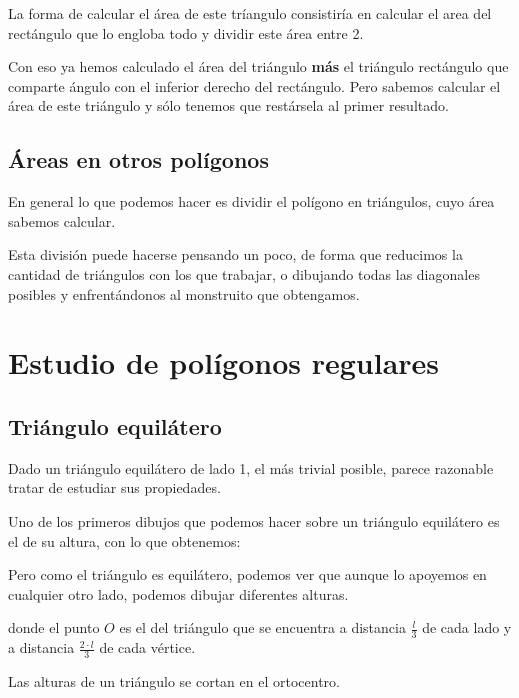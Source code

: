 \documentclass{apuntes}
\begin{document}
La forma de calcular el área de este tríangulo consistiría en calcular el area del rectángulo que lo engloba todo y dividir este área entre 2.

Con eso ya hemos calculado el área del triángulo \textbf{más} el triángulo rectángulo que comparte ángulo con el inferior derecho del rectángulo. Pero sabemos calcular el área de este triángulo y sólo tenemos que restársela al primer resultado.

\subsection{Áreas en otros polígonos}
En general lo que podemos hacer es dividir el polígono en triángulos, cuyo área sabemos calcular.

Esta división puede hacerse pensando un poco, de forma que reducimos la cantidad de triángulos con los que trabajar, o dibujando todas las diagonales posibles y enfrentándonos al monstruito que obtengamos.

\section{Estudio de polígonos regulares}
\subsection{Triángulo equilátero}
Dado un triángulo equilátero de lado 1, el más trivial posible, parece razonable tratar de estudiar sus propiedades.

Uno de los primeros dibujos que podemos hacer sobre un triángulo equilátero es el de su altura, con lo que obtenemos:
\begin{center}
\end{center}

Pero como el triángulo es equilátero, podemos ver que aunque lo apoyemos en cualquier otro lado, podemos dibujar diferentes alturas.

\begin{center}
\end{center}

donde el punto $O$ es el  del triángulo que se encuentra a distancia $\frac{l}{3}$ de cada lado y a distancia $\frac{2\cdot l}{3}$ de cada vértice.

\begin{theorem}
Las alturas de un triángulo se cortan en el ortocentro.
\end{theorem}
\end{document}
